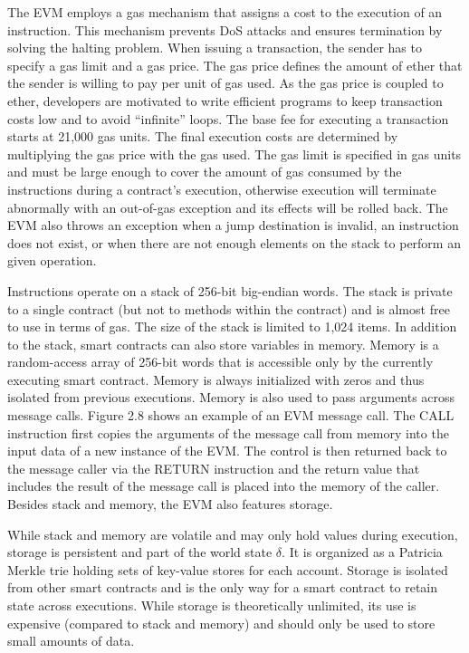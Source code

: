         The EVM employs a gas mechanism that assigns a cost to the execution of an instruction. This mechanism prevents DoS attacks and ensures termination by solving the halting problem. When issuing a transaction, the sender has to specify a gas limit and a gas price. The gas price defines the amount of ether that the sender is willing to pay per unit of gas used. As the gas price is coupled to ether, developers are motivated to write efficient programs to keep transaction costs low and to avoid “infinite” loops. The base fee for executing a transaction starts at 21,000 gas units. The final execution costs are determined by multiplying the gas price with the gas used. The gas limit is specified in gas units and must be large enough to cover the amount of gas consumed by the instructions during a contract’s execution, otherwise execution will terminate abnormally with an out-of-gas exception and its effects will be rolled back. The EVM also throws an exception when a jump destination is invalid, an instruction does not exist, or when there are not enough elements on the stack to perform an given operation.

        Instructions operate on a stack of 256-bit big-endian words. The stack is private to a single contract (but not to methods within the contract) and is almost free to use in terms of gas. The size of the stack is limited to 1,024 items. In addition to the stack, smart contracts can also store variables in memory. Memory is a random-access array of 256-bit words that is accessible only by the currently executing smart contract. Memory is always initialized with zeros and thus isolated from previous executions. Memory is also used to pass arguments across message calls. Figure 2.8 shows an example of an EVM message call. The CALL instruction first copies the arguments of the message call from memory into the input data of a new instance of the EVM. The control is then returned back to the message caller via the RETURN instruction and the return value that includes the result of the message call is placed into the memory of the caller. Besides stack and memory, the EVM also features storage.

        While stack and memory are volatile and may only hold values during execution, storage is persistent and part of the world state $\delta$.
        It is organized as a Patricia Merkle trie holding sets of key-value stores for each account.
        Storage is isolated from other smart contracts and is the only way for a smart contract to retain state across executions.
        While storage is theoretically unlimited, its use is expensive (compared to stack and memory) and should only be used to store small amounts of data.




